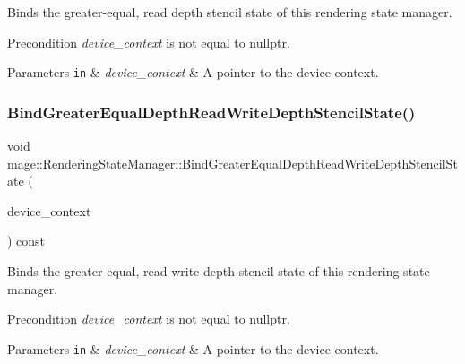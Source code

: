 Binds the greater-\/equal, read depth stencil state of this rendering state manager.

\begin{DoxyPrecond}{Precondition}
{\itshape device\+\_\+context} is not equal to {\ttfamily nullptr}. 
\end{DoxyPrecond}

\begin{DoxyParams}[1]{Parameters}
\mbox{\tt in}  & {\em device\+\_\+context} & A pointer to the device context. \\
\hline
\end{DoxyParams}
\hypertarget{classmage_1_1_rendering_state_manager_a88ba17c9b7c7f38ac9fb9dd17628d2fc}{}\label{classmage_1_1_rendering_state_manager_a88ba17c9b7c7f38ac9fb9dd17628d2fc} 
\subsubsection{\texorpdfstring{Bind\+Greater\+Equal\+Depth\+Read\+Write\+Depth\+Stencil\+State()}{BindGreaterEqualDepthReadWriteDepthStencilState()}}
{\footnotesize\ttfamily void mage\+::\+Rendering\+State\+Manager\+::\+Bind\+Greater\+Equal\+Depth\+Read\+Write\+Depth\+Stencil\+State (\begin{DoxyParamCaption}\item[{I\+D3\+D11\+Device\+Context2 $\ast$}]{device\+\_\+context }\end{DoxyParamCaption}) const\hspace{0.3cm}{\ttfamily [noexcept]}}

Binds the greater-\/equal, read-\/write depth stencil state of this rendering state manager.

\begin{DoxyPrecond}{Precondition}
{\itshape device\+\_\+context} is not equal to {\ttfamily nullptr}. 
\end{DoxyPrecond}

\begin{DoxyParams}[1]{Parameters}
\mbox{\tt in}  & {\em device\+\_\+context} & A pointer to the device context. \\
\hline
\end{DoxyParams}
\hypertarget{classmage_1_1_rendering_state_manager_a3e4f35ec49cae88bb12b08f53048f0cc}{}\label{classmage_1_1_rendering_state_manager_a3e4f35ec49cae88bb12b08f53048f0cc} 
